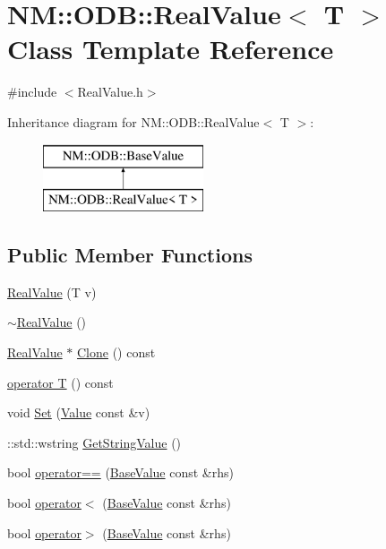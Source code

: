 \hypertarget{class_n_m_1_1_o_d_b_1_1_real_value}{}\section{N\+M\+:\+:O\+D\+B\+:\+:Real\+Value$<$ T $>$ Class Template Reference}
\label{class_n_m_1_1_o_d_b_1_1_real_value}


{\ttfamily \#include $<$Real\+Value.\+h$>$}

Inheritance diagram for N\+M\+:\+:O\+D\+B\+:\+:Real\+Value$<$ T $>$\+:\begin{figure}[H]
\begin{center}
\leavevmode
\includegraphics[height=2.000000cm]{class_n_m_1_1_o_d_b_1_1_real_value}
\end{center}
\end{figure}
\subsection*{Public Member Functions}
\begin{DoxyCompactItemize}
\item 
\hyperlink{class_n_m_1_1_o_d_b_1_1_real_value_a6461d728d15aed7ea529343546a364d4}{Real\+Value} (T v)
\item 
\hyperlink{class_n_m_1_1_o_d_b_1_1_real_value_abeec86c680999ab208b0cd8772813338}{$\sim$\+Real\+Value} ()
\item 
\hyperlink{class_n_m_1_1_o_d_b_1_1_real_value}{Real\+Value} $\ast$ \hyperlink{class_n_m_1_1_o_d_b_1_1_real_value_aef8e2c45cf4001f5115d24f8beb1f4df}{Clone} () const 
\item 
\hyperlink{class_n_m_1_1_o_d_b_1_1_real_value_ae521a99bc67b860d58c905a02e39895d}{operator T} () const 
\item 
void \hyperlink{class_n_m_1_1_o_d_b_1_1_real_value_a51fcdc7f0511e26b923ccfc47e20cb08}{Set} (\hyperlink{class_n_m_1_1_o_d_b_1_1_value}{Value} const \&v)
\item 
\+::std\+::wstring \hyperlink{class_n_m_1_1_o_d_b_1_1_real_value_ac34574ad4f573ea467b5469403379f14}{Get\+String\+Value} ()
\item 
bool \hyperlink{class_n_m_1_1_o_d_b_1_1_real_value_a296f8da033d8e15c56d666b4df7fe93f}{operator==} (\hyperlink{class_n_m_1_1_o_d_b_1_1_base_value}{Base\+Value} const \&rhs)
\item 
bool \hyperlink{class_n_m_1_1_o_d_b_1_1_real_value_ad517ae8cfd80888a798c17ecee7435fe}{operator$<$} (\hyperlink{class_n_m_1_1_o_d_b_1_1_base_value}{Base\+Value} const \&rhs)
\item 
bool \hyperlink{class_n_m_1_1_o_d_b_1_1_real_value_a4c7dfb8876b4963fc61104fc19de7b28}{operator$>$} (\hyperlink{class_n_m_1_1_o_d_b_1_1_base_value}{Base\+Value} const \&rhs)
\end{DoxyCompactItemize}
